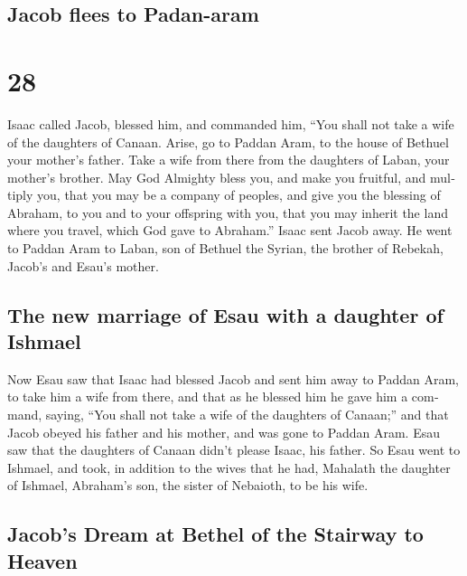 \begin{paracol}{2}
\switchcolumn
\begin{otherlanguage}{english}

\hypertarget{jacob-flees-to-padan-aram}{%
\subsection{Jacob flees to Padan-aram}\label{jacob-flees-to-padan-aram}}

\hypertarget{section-55}{%
\section{28}\label{section-55}}

 Isaac called Jacob, blessed him, and commanded him, ``You
shall not take a wife of the daughters of Canaan.  Arise,
go to Paddan Aram, to the house of Bethuel your mother's father. Take a
wife from there from the daughters of Laban, your mother's brother.
 May God Almighty bless you, and make you fruitful, and
multiply you, that you may be a company of peoples,  and
give you the blessing of Abraham, to you and to your offspring with you,
that you may inherit the land where you travel, which God gave to
Abraham.''  Isaac sent Jacob away. He went to Paddan Aram
to Laban, son of Bethuel the Syrian, the brother of Rebekah, Jacob's and
Esau's mother.

\hypertarget{the-new-marriage-of-esau-with-a-daughter-of-ishmael}{%
\subsection{The new marriage of Esau with a daughter of
Ishmael}\label{the-new-marriage-of-esau-with-a-daughter-of-ishmael}}

 Now Esau saw that Isaac had blessed Jacob and sent him
away to Paddan Aram, to take him a wife from there, and that as he
blessed him he gave him a command, saying, ``You shall not take a wife
of the daughters of Canaan;''  and that Jacob obeyed his
father and his mother, and was gone to Paddan Aram.  Esau
saw that the daughters of Canaan didn't please Isaac, his father.
 So Esau went to Ishmael, and took, in addition to the
wives that he had, Mahalath the daughter of Ishmael, Abraham's son, the
sister of Nebaioth, to be his wife.

\hypertarget{jacobs-dream-at-bethel-of-the-stairway-to-heaven}{%
\subsection{Jacob's Dream at Bethel of the Stairway to
Heaven}\label{jacobs-dream-at-bethel-of-the-stairway-to-heaven}}


\end{otherlanguage}
\end{paracol}
